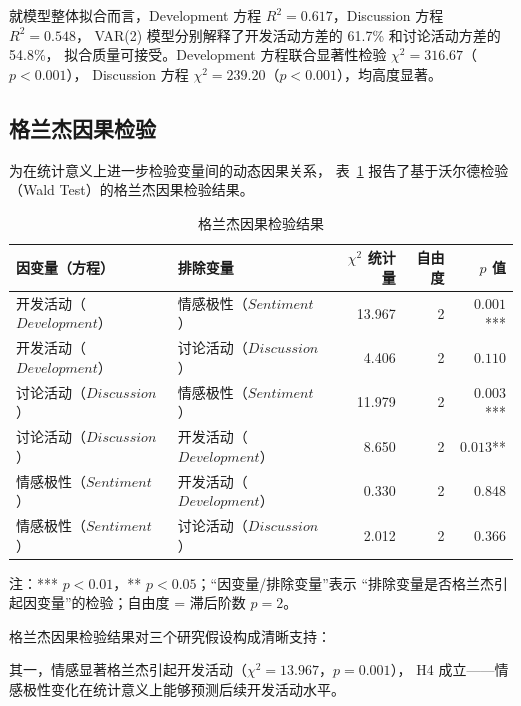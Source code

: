 \documentclass[
    type = master, %
    degree = professional,        %
    decl-page,  %
    twoside,                %
    fontset = fandol %
  ]{njuthesis}
\begin{document}
就模型整体拟合而言，Development 方程 $R^2 = 0.617$，Discussion 方程 $R^2 = 0.548$，
VAR(2) 模型分别解释了开发活动方差的 61.7\% 和讨论活动方差的 54.8\%，
拟合质量可接受。Development 方程联合显著性检验 $\chi^2 = 316.67$（$p < 0.001$），
Discussion 方程 $\chi^2 = 239.20$（$p < 0.001$），均高度显著。

\subsection{格兰杰因果检验}

为在统计意义上进一步检验变量间的动态因果关系，
表~\ref{tab:granger} 报告了基于沃尔德检验（Wald Test）的格兰杰因果检验结果。

\begin{table}[htbp]
    \centering
    \caption{格兰杰因果检验结果}
    \label{tab:granger}
    \begin{tabularx}{\textwidth}{p{3.5cm}Xrrr}
        \toprule
        因变量（方程） & 排除变量 & $\chi^2$ 统计量 & 自由度 & $p$ 值 \\
        \midrule
        开发活动（$Development$）     & 情感极性（$Sentiment$） & 13.967 & 2 & $0.001$*** \\
        开发活动（$Development$）     & 讨论活动（$Discussion$）   & 4.406  & 2 & $0.110$ \\
        讨论活动（$Discussion$）  & 情感极性（$Sentiment$） & 11.979 & 2 & $0.003$*** \\
        讨论活动（$Discussion$）  & 开发活动（$Development$）      & 8.650  & 2 & $0.013$** \\
        情感极性（$Sentiment$） & 开发活动（$Development$）      & 0.330  & 2 & $0.848$ \\
        情感极性（$Sentiment$） & 讨论活动（$Discussion$）   & 2.012  & 2 & $0.366$ \\
        \bottomrule
    \end{tabularx}
    \begin{minipage}{\textwidth}
        \vspace{0.3em}
        \footnotesize 注：*** $p < 0.01$，** $p < 0.05$；“因变量/排除变量”表示
              “排除变量是否格兰杰引起因变量”的检验；自由度 = 滞后阶数 $p = 2$。
    \end{minipage}
\end{table}

格兰杰因果检验结果对三个研究假设构成清晰支持：

其一，情感显著格兰杰引起开发活动（$\chi^2 = 13.967$，$p = 0.001$），
H4 成立——情感极性变化在统计意义上能够预测后续开发活动水平。
\end{document}
